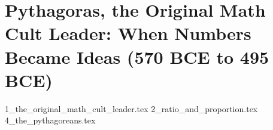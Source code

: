 \section{Pythagoras, the Original Math Cult Leader: When Numbers Became Ideas (570 BCE to 495 BCE)}

{1_the_original_math_cult_leader.tex}
{2_ratio_and_proportion.tex}
{4_the_pythagoreans.tex}